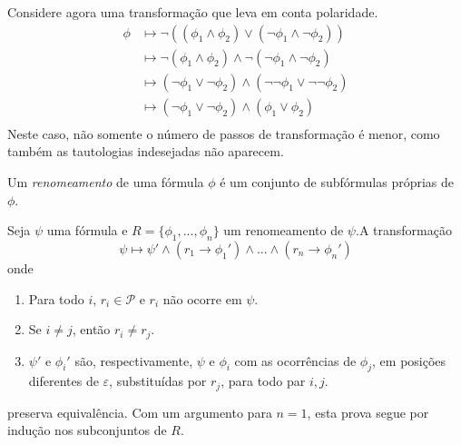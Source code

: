 \begin{example}
    Considere agora uma transformação que leva em conta polaridade.
    \begin{equation*}
        \begin{split}
            \phi & \longmapsto \neg((\phi_1 \wedge \phi_2) \vee (\neg \phi_1 \wedge \neg \phi_2)) \\
                 & \longmapsto \neg(\phi_1 \wedge \phi_2) \wedge \neg(\neg \phi_1 \wedge \neg \phi_2) \\
                 & \longmapsto (\neg \phi_1 \vee \neg \phi_2) \wedge (\neg \neg \phi_1 \vee \neg \neg \phi_2) \\
                 & \longmapsto (\neg \phi_1 \vee \neg \phi_2) \wedge (\phi_1 \vee \phi_2) \\
        \end{split}
    \end{equation*}
    Neste caso, não somente o número de passos de transformação é menor, como também as tautologias indesejadas não aparecem.
\end{example}

\begin{definition}
    Um \emph{renomeamento} de uma fórmula $\phi$ é um conjunto de subfórmulas próprias de $\phi$.
\end{definition}

\begin{theorem}
    Seja $\psi$ uma fórmula e $R = \{\phi_1,...,\phi_n\}$ um renomeamento de $\psi$.\break A transformação $$\psi \longmapsto \psi' \wedge (r_1 \rightarrow \phi_1') \wedge ... \wedge (r_n \rightarrow \phi_n')$$ onde
    \begin{enumerate}
        \item Para todo $i$, $r_i \in \mathcal{P}$ e $r_i$ não ocorre em $\psi$.
        \item Se $i \neq j$, então $r_i \neq r_j$.
        \item $\psi'$ e $\phi_i'$ são, respectivamente, $\psi$ e $\phi_i$ com as ocorrências de $\phi_j$, em posições diferentes de $\varepsilon$, substituídas por $r_j$, para todo par $i,j$.
    \end{enumerate}
    preserva equivalência. Com um argumento para $n=1$, esta prova segue por indução nos subconjuntos de $R$.
\end{theorem}

\begin{example}
    
\end{example}